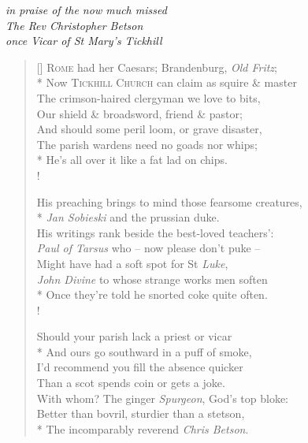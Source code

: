 \begin{center}
\textit{in praise of the now much missed}\\
\textit{The Rev Christopher Betson}\\
\textit{once Vicar of St Mary's Tickhill}
\end{center}

\bigskip

\settowidth{\versewidth}{His preaching brings to mind those fearsome creatures,}
\begin{verse}[\versewidth]
\textsc{Rome} had her Caesars; Brandenburg, \textit{Old Fritz};\\*
\vin Now \textsc{Tickhill Church} can claim as squire \& master\\
The crimson-haired clergyman we love to bits,\\
\vin Our shield \& broadsword, friend \& pastor;\\
\vin And should some peril loom, or grave disaster,\\
The parish wardens need no goads nor whips;\\*
He's all over it like a fat lad on chips.\\!

His preaching brings to mind those fearsome creatures,\\*
\vin \textit{Jan Sobieski} and the prussian duke.\\
His writings rank beside the best-loved teachers':\\
\vin \textit{Paul of Tarsus} who -- now please don't puke --\\
\vin Might have had a soft spot for St \textit{Luke},\\
\textit{John Divine} to whose strange works men soften\\*
Once they're told he snorted coke quite often.\\!

Should your parish lack a priest or vicar\\*
\vin And ours go southward in a puff of smoke,\\
I'd recommend you fill the absence quicker\\
\vin Than a scot spends coin or gets a joke.\\
\vin With whom? The ginger \textit{Spurgeon}, God's top bloke:\\
Better than bovril, sturdier than a stetson,\\*
The incomparably reverend \textit{Chris Betson}.
\end{verse}
